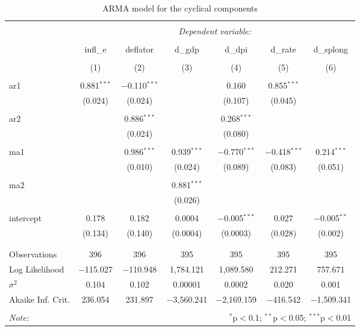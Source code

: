 
\begin{table}[!htbp] \centering 
  \caption{ARMA model for the cyclical components} 
  \label{tab:all_arma} 
\begin{tabular}{@{\extracolsep{5pt}}lcccccc} 
\\[-1.8ex]\hline 
\hline \\[-1.8ex] 
 & \multicolumn{6}{c}{\textit{Dependent variable:}} \\ 
\cline{2-7} 
\\[-1.8ex] &  infl\_e & deflator  & d\_gdp  & d\_dpi  &d\_rate  & d\_splong \\ 
\\[-1.8ex] & (1) & (2) & (3) & (4) & (5) & (6)\\ 
\hline \\[-1.8ex] 
 ar1 & 0.881$^{***}$ & $-$0.110$^{***}$ &  & 0.160 & 0.855$^{***}$ &  \\ 
  & (0.024) & (0.024) &  & (0.107) & (0.045) &  \\ 
  & & & & & & \\ 
 ar2 &  & 0.886$^{***}$ &  & 0.268$^{***}$ &  &  \\ 
  &  & (0.024) &  & (0.080) &  &  \\ 
  & & & & & & \\ 
 ma1 &  & 0.986$^{***}$ & 0.939$^{***}$ & $-$0.770$^{***}$ & $-$0.418$^{***}$ & 0.214$^{***}$ \\ 
  &  & (0.010) & (0.024) & (0.089) & (0.083) & (0.051) \\ 
  & & & & & & \\ 
 ma2 &  &  & 0.881$^{***}$ &  &  &  \\ 
  &  &  & (0.026) &  &  &  \\ 
  & & & & & & \\ 
 intercept & 0.178 & 0.182 & 0.0004 & $-$0.005$^{***}$ & 0.027 & $-$0.005$^{**}$ \\ 
  & (0.134) & (0.140) & (0.0004) & (0.0003) & (0.028) & (0.002) \\ 
  & & & & & & \\ 
\hline \\[-1.8ex] 
Observations & 396 & 396 & 395 & 395 & 395 & 395 \\ 
Log Likelihood & $-$115.027 & $-$110.948 & 1,784.121 & 1,089.580 & 212.271 & 757.671 \\ 
$\sigma^{2}$ & 0.104 & 0.102 & 0.00001 & 0.0002 & 0.020 & 0.001 \\ 
Akaike Inf. Crit. & 236.054 & 231.897 & $-$3,560.241 & $-$2,169.159 & $-$416.542 & $-$1,509.341 \\ 
\hline 
\hline \\[-1.8ex] 
\textit{Note:}  & \multicolumn{6}{r}{$^{*}$p$<$0.1; $^{**}$p$<$0.05; $^{***}$p$<$0.01} \\ 
\end{tabular} 
\end{table} 

